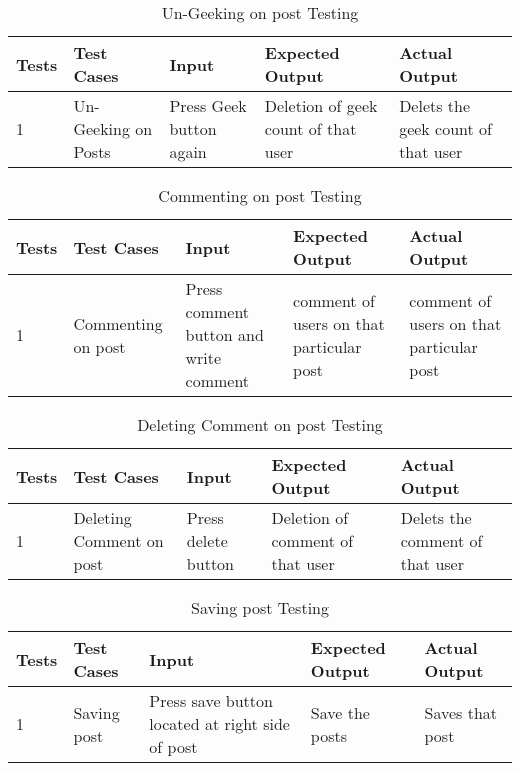 \begin{table}[H]
    \caption{Un-Geeking on post Testing}
        \label{}
    \begin{tabular}{|p{0.3in}|p{1.2in}|p{1.2in}|p{1.2in}|p{1in}|}
        \hline
        Tests & Test Cases & Input &Expected Output & Actual Output \\
        \hline
            1 & Un-Geeking on Posts & Press Geek button again & Deletion of geek count of that user &Delets the geek count of that user \\
            \hline
\end{tabular}
\end{table}

\begin{table}[H]
    \caption{Commenting on post Testing}
        \label{}
    \begin{tabular}{|p{0.3in}|p{1.2in}|p{1.2in}|p{1.2in}|p{1in}|}
        \hline
        Tests & Test Cases & Input &Expected Output & Actual Output \\
        \hline
            1 &Commenting on post & Press comment button and write comment & comment of users on that particular post & comment of users on that particular post \\
            \hline
\end{tabular}
\end{table}

\begin{table}[H]
    \caption{Deleting Comment on post Testing}
        \label{}
    \begin{tabular}{|p{0.3in}|p{1.2in}|p{1.2in}|p{1.2in}|p{1in}|}
        \hline
        Tests & Test Cases & Input &Expected Output & Actual Output \\
        \hline
            1 &Deleting Comment on post & Press delete button & Deletion of comment of that user& Delets the comment of that user \\
            \hline
\end{tabular}
\end{table}

\begin{table}[H]
    \caption{Saving post Testing}
        \label{}
    \begin{tabular}{|p{0.3in}|p{1.2in}|p{1.2in}|p{1.2in}|p{1in}|}
        \hline
        Tests & Test Cases & Input &Expected Output & Actual Output \\
        \hline
            1 &Saving post & Press save button located at right side of post & Save the posts & Saves that post \\
            \hline
\end{tabular}
\end{table}

